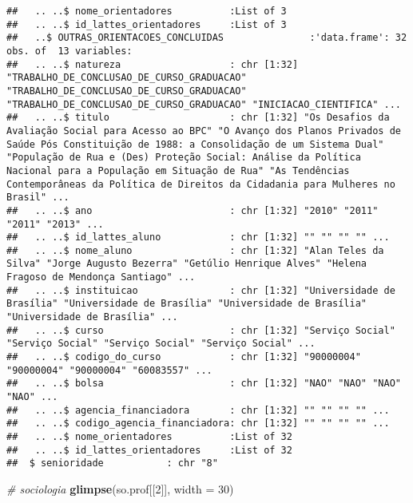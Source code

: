 \documentclass[]{article}
\newenvironment{Shaded}{\begin{snugshade}}{\end{snugshade}}
\newcommand{\KeywordTok}[1]{\textcolor[rgb]{0.13,0.29,0.53}{\textbf{#1}}}
\newcommand{\DataTypeTok}[1]{\textcolor[rgb]{0.13,0.29,0.53}{#1}}
\newcommand{\DecValTok}[1]{\textcolor[rgb]{0.00,0.00,0.81}{#1}}
\newcommand{\CommentTok}[1]{\textcolor[rgb]{0.56,0.35,0.01}{\textit{#1}}}
\newcommand{\NormalTok}[1]{#1}
\begin{document}
\begin{verbatim}
##   .. ..$ nome_orientadores          :List of 3
##   .. ..$ id_lattes_orientadores     :List of 3
##   ..$ OUTRAS_ORIENTACOES_CONCLUIDAS               :'data.frame': 32 obs. of  13 variables:
##   .. ..$ natureza                   : chr [1:32] "TRABALHO_DE_CONCLUSAO_DE_CURSO_GRADUACAO" "TRABALHO_DE_CONCLUSAO_DE_CURSO_GRADUACAO" "TRABALHO_DE_CONCLUSAO_DE_CURSO_GRADUACAO" "INICIACAO_CIENTIFICA" ...
##   .. ..$ titulo                     : chr [1:32] "Os Desafios da Avaliação Social para Acesso ao BPC" "O Avanço dos Planos Privados de Saúde Pós Constituição de 1988: a Consolidação de um Sistema Dual" "População de Rua e (Des) Proteção Social: Análise da Política Nacional para a População em Situação de Rua" "As Tendências Contemporâneas da Política de Direitos da Cidadania para Mulheres no Brasil" ...
##   .. ..$ ano                        : chr [1:32] "2010" "2011" "2011" "2013" ...
##   .. ..$ id_lattes_aluno            : chr [1:32] "" "" "" "" ...
##   .. ..$ nome_aluno                 : chr [1:32] "Alan Teles da Silva" "Jorge Augusto Bezerra" "Getúlio Henrique Alves" "Helena Fragoso de Mendonça Santiago" ...
##   .. ..$ instituicao                : chr [1:32] "Universidade de Brasília" "Universidade de Brasília" "Universidade de Brasília" "Universidade de Brasília" ...
##   .. ..$ curso                      : chr [1:32] "Serviço Social" "Serviço Social" "Serviço Social" "Serviço Social" ...
##   .. ..$ codigo_do_curso            : chr [1:32] "90000004" "90000004" "90000004" "60083557" ...
##   .. ..$ bolsa                      : chr [1:32] "NAO" "NAO" "NAO" "NAO" ...
##   .. ..$ agencia_financiadora       : chr [1:32] "" "" "" "" ...
##   .. ..$ codigo_agencia_financiadora: chr [1:32] "" "" "" "" ...
##   .. ..$ nome_orientadores          :List of 32
##   .. ..$ id_lattes_orientadores     :List of 32
##  $ senioridade           : chr "8"
\end{verbatim}

\begin{Shaded}
\begin{Highlighting}[]
\CommentTok{# sociologia}
\KeywordTok{glimpse}\NormalTok{(so.prof[[}\DecValTok{2}\NormalTok{]], }\DataTypeTok{width =} \DecValTok{30}\NormalTok{)}
\end{Highlighting}
\end{Shaded}
\end{document}
